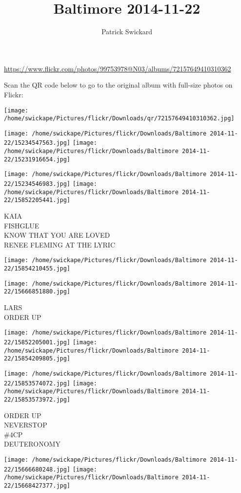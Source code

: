 \documentclass[10pt,letterpaper]{article}
\title{Baltimore 2014-11-22}
\author{Patrick Swickard}
\date{}
\begin{document}
\maketitle

\url{https://www.flickr.com/photos/99753978@N03/albums/72157649410310362}

Scan the QR code below to go to the original album with full-size photos on Flickr:

\texttt{[image: /home/swickape/Pictures/flickr/Downloads/qr/72157649410310362.jpg]}
\pagebreak

\texttt{[image: /home/swickape/Pictures/flickr/Downloads/Baltimore 2014-11-22/15234547563.jpg]}
\texttt{[image: /home/swickape/Pictures/flickr/Downloads/Baltimore 2014-11-22/15231916654.jpg]}

\texttt{[image: /home/swickape/Pictures/flickr/Downloads/Baltimore 2014-11-22/15234546983.jpg]}
\texttt{[image: /home/swickape/Pictures/flickr/Downloads/Baltimore 2014-11-22/15852205441.jpg]}

KAIA\\
FISHGLUE\\
KNOW THAT YOU ARE LOVED\\
RENEE FLEMING AT THE LYRIC
\pagebreak

\texttt{[image: /home/swickape/Pictures/flickr/Downloads/Baltimore 2014-11-22/15854210455.jpg]}

\vspace{0.25in}
\texttt{[image: /home/swickape/Pictures/flickr/Downloads/Baltimore 2014-11-22/15666851880.jpg]}

LARS\\
ORDER UP
\pagebreak

\texttt{[image: /home/swickape/Pictures/flickr/Downloads/Baltimore 2014-11-22/15852205001.jpg]}
\texttt{[image: /home/swickape/Pictures/flickr/Downloads/Baltimore 2014-11-22/15854209805.jpg]}

\texttt{[image: /home/swickape/Pictures/flickr/Downloads/Baltimore 2014-11-22/15853574072.jpg]}
\texttt{[image: /home/swickape/Pictures/flickr/Downloads/Baltimore 2014-11-22/15853573972.jpg]}

ORDER UP\\
NEVERSTOP\\
\#4CP\\
DEUTERONOMY
\pagebreak

\texttt{[image: /home/swickape/Pictures/flickr/Downloads/Baltimore 2014-11-22/15666680248.jpg]}
\texttt{[image: /home/swickape/Pictures/flickr/Downloads/Baltimore 2014-11-22/15668427377.jpg]}
\end{document}
